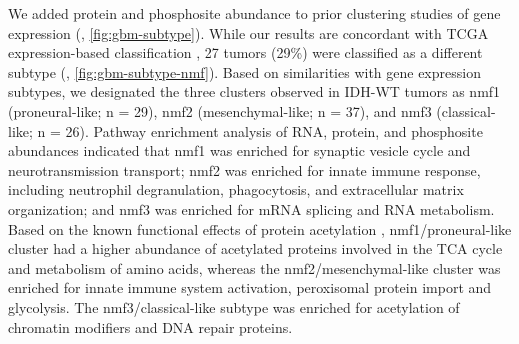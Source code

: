 We added protein and phosphosite abundance to prior clustering studies of gene expression (, \ref{fig:gbm-subtype}). While our results are concordant with TCGA expression-based classification \cite{wangq_verhaakrgw:TumorEvolution2017}, 27 tumors (29\%) were classified as a different subtype (, \ref{fig:gbm-subtype-nmf}).
Based on similarities with gene expression subtypes, we designated the three clusters observed in IDH-WT tumors as nmf1 (proneural-like; n = 29), nmf2 (mesenchymal-like; n = 37), and nmf3 (classical-like; n = 26).
Pathway enrichment analysis of RNA, protein, and phosphosite abundances indicated that nmf1 was enriched for synaptic vesicle cycle and neurotransmission transport; nmf2 was enriched for innate immune response, including neutrophil degranulation, phagocytosis, and extracellular matrix organization; and nmf3 was enriched for mRNA splicing and RNA metabolism.
Based on the known functional effects of protein acetylation \cite{naritat_choudharyc:FunctionsMechanisms2019}, nmf1/proneural-like cluster had a higher abundance of acetylated proteins involved in the TCA cycle and metabolism of amino acids, whereas the nmf2/mesenchymal-like cluster was enriched for innate immune system activation, peroxisomal protein import and glycolysis. The nmf3/classical-like subtype was enriched for acetylation of chromatin modifiers and DNA repair proteins.

